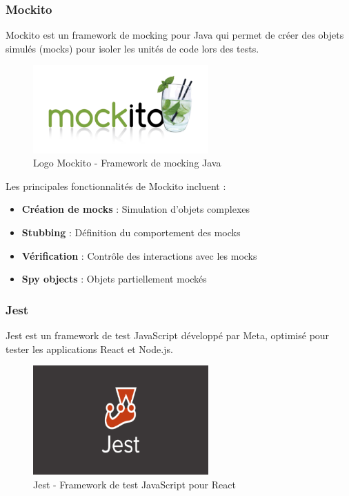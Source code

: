 \documentclass[12pt,a4paper]{report}
\begin{document}
\subsubsection{Mockito}

Mockito est un framework de mocking pour Java qui permet de créer des objets simulés (mocks) pour isoler les unités de code lors des tests.

\begin{figure}[htbp]
    \centering
    \includegraphics[width=0.6\textwidth]{latex_media/media/mockito.png}
    \caption{Logo Mockito - Framework de mocking Java}
    \label{fig:mockito-logo}
\end{figure}

Les principales fonctionnalités de Mockito incluent :
\begin{itemize}
    \item \textbf{Création de mocks} : Simulation d'objets complexes
    \item \textbf{Stubbing} : Définition du comportement des mocks
    \item \textbf{Vérification} : Contrôle des interactions avec les mocks
    \item \textbf{Spy objects} : Objets partiellement mockés
\end{itemize}

\subsubsection{Jest}

Jest est un framework de test JavaScript développé par Meta, optimisé pour tester les applications React et Node.js.

\begin{figure}[htbp]
    \centering
    \includegraphics[width=0.6\textwidth]{latex_media/media/jest_react_test.png}
    \caption{Jest - Framework de test JavaScript pour React}
    \label{fig:jest-logo}
\end{figure}
\end{document}
